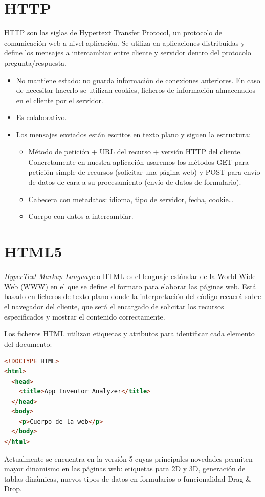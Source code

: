\documentclass[a4paper, 12pt]{book}
\begin{document}
\section{HTTP} 
\label{sec:seccion5}
HTTP son las siglas de Hypertext Transfer Protocol, un protocolo de comunicación web a nivel aplicación. Se utiliza en aplicaciones distribuidas y define los mensajes a intercambiar entre cliente y servidor dentro del protocolo pregunta/respuesta.  
\begin{itemize}
	\item No mantiene estado: no guarda información de conexiones anteriores. En caso de necesitar hacerlo se utilizan cookies, ficheros de información almacenados en el cliente por el servidor. 
	\item Es colaborativo. 
	\item Los mensajes enviados están escritos en texto plano y siguen la estructura:
	\begin{itemize}
		\item Método de petición + URL del recurso + versión HTTP del cliente. Concretamente en nuestra aplicación usaremos los métodos GET para petición simple de recursos (solicitar una página web) y POST para envío de datos de cara a su procesamiento (envío de datos de formulario). 
		\item Cabecera con metadatos: idioma, tipo de servidor, fecha, cookie\ldots
		\item Cuerpo con datos a intercambiar.
	\end{itemize}	
\end{itemize}
\section{HTML5} 
\label{sec:seccion6}
\textit{HyperText Markup Language} o HTML es el lenguaje estándar de la World Wide Web (WWW) en el que se define el formato para elaborar las páginas web. Está basado en ficheros de texto plano donde la interpretación del código recaerá sobre el navegador del cliente, que será el encargado de solicitar los recursos especificados y mostrar el contenido correctamente. 

Los ficheros HTML utilizan etiquetas y atributos para identificar cada elemento del documento:
\begin{lstlisting}[language=HTML]
<!DOCTYPE HTML> 
<html>
  <head>
    <title>App Inventor Analyzer</title>
  </head>
  <body>
    <p>Cuerpo de la web</p>
  </body>
</html>
\end{lstlisting}
Actualmente se encuentra en la versión 5 cuyas principales novedades permiten mayor dinamismo en las páginas web: etiquetas para 2D y 3D, generación de tablas dinámicas, nuevos tipos de datos en formularios o funcionalidad Drag \& Drop. 
\end{document}
